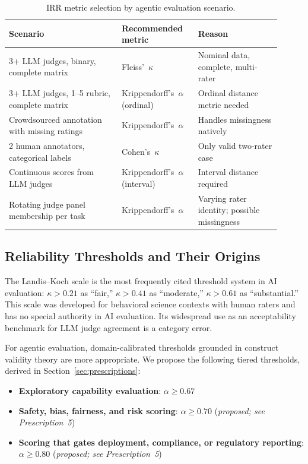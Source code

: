 \documentclass[preprint,12pt]{elsarticle}
\newcommand{\ka}{Krippendorff's~$\alpha$}
\newcommand{\fk}{Fleiss'~$\kappa$}
\newcommand{\ck}{Cohen's~$\kappa$}
\begin{document}
\begin{table}[ht]
\centering
\caption{IRR metric selection by agentic evaluation scenario.}
\label{tab:irr-selection}
\small
\begin{tabular}{@{}p{0.38\linewidth}p{0.25\linewidth}p{0.28\linewidth}@{}}
\toprule
Scenario & Recommended metric & Reason \\
\midrule
3+ LLM judges, binary, complete matrix
  & \fk & Nominal data, complete, multi-rater \\[4pt]
3+ LLM judges, 1--5 rubric, complete matrix
  & \ka{} (ordinal) & Ordinal distance metric needed \\[4pt]
Crowdsourced annotation with missing ratings
  & \ka & Handles missingness natively \\[4pt]
2 human annotators, categorical labels
  & \ck & Only valid two-rater case \\[4pt]
Continuous scores from LLM judges
  & \ka{} (interval) & Interval distance required \\[4pt]
Rotating judge panel membership per task
  & \ka & Varying rater identity; possible missingness \\
\bottomrule
\end{tabular}
\end{table}

\subsection{Reliability Thresholds and Their Origins}
\label{sec:thresholds}

The Landis--Koch scale \citep{landis1977} is the most frequently cited threshold
system in AI evaluation: $\kappa > 0.21$ as ``fair,'' $\kappa > 0.41$ as
``moderate,'' $\kappa > 0.61$ as ``substantial.'' This scale was developed for
behavioral science contexts with human raters and has no special authority in AI
evaluation. Its widespread use as an acceptability benchmark for LLM judge agreement
is a category error.

For agentic evaluation, domain-calibrated thresholds grounded in construct validity
theory are more appropriate. We propose the following tiered thresholds, derived in
Section~\ref{sec:prescriptions}:

\begin{itemize}
  \item \textbf{Exploratory capability evaluation}: $\alpha \geq 0.67$
    \citep[pp.~241--243]{krippendorff2004}
  \item \textbf{Safety, bias, fairness, and risk scoring}: $\alpha \geq 0.70$
    (\emph{proposed; see Prescription~5})
  \item \textbf{Scoring that gates deployment, compliance, or regulatory reporting}:
    $\alpha \geq 0.80$ (\emph{proposed; see Prescription~5})
\end{itemize}
\end{document}
